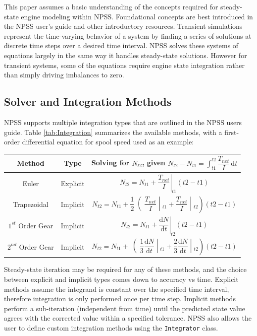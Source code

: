 \documentclass[heading.tex]{subfiles}
\begin{document}
This paper assumes a basic understanding of the concepts required for steady-state engine modeling within NPSS.
Foundational concepts are best introduced in the NPSS user's guide \cite{NPSS} and other introductory resources.
\cite{JonesIntro} 
Transient simulations represent the time-varying behavior of a system by finding a series of
solutions at discrete time steps over a desired time interval. NPSS solves these systems of
equations largely in the same way it handles steady-state solutions. However for transient
systems, some of the equations require engine state integration rather than simply driving imbalances to zero.


\subsection{Solver and Integration Methods}
NPSS supports multiple integration types that are outlined in the NPSS users guide.
\cite[chap.~7.1]{NPSS} Table \ref{tab:Integration} summarizes the available methods, with a 
first-order differential equation for spool speed used as an example: 

\begin{minipage}{\linewidth}
\centering
\bigskip
{} \label{tab:Integration}
\begin{tabular}{|c|c|c|}
\hline 
Method & Type & Solving for  $N_{t2}$, given  $N_{t2}- N_{t1}= \int_{t1}^{t2} \! \dfrac{T_{net}}{I} \, \mathrm{d}t $\\ 
\hline 
Euler & Explicit & $ \left.N_{t2}= N_{t1} + \dfrac{T_{net}}{I} \right|_{t1}^{}(t2-t1)$ \\ 
\hline 
Trapezoidal & Implicit & $ \left.N_{t2}= N_{t1} + \dfrac{1}{2}\middle(\dfrac{T_{net}}{I} \middle|_{t1}^{}+\dfrac{T_{net}}{I} \middle|_{t2}^{}\right)(t2-t1)$ \\ 
\hline 
$1^{st}$ Order Gear & Implicit & $ \left.N_{t2}= N_{t1} + \dfrac{ \mathrm{d}N }{ \mathrm{d}t } \right|_{t2}^{}(t2-t1)$ \\ 
\hline 
$2^{nd}$ Order Gear & Implicit & $ \left.N_{t2}= N_{t1} + \middle(\dfrac{1}{3}\dfrac{ \mathrm{d}N }{ \mathrm{d}t }\middle|_{t1}^{}+\dfrac{2}{3}\dfrac{ \mathrm{d}N }{ \mathrm{d}t }\middle|_{t2}^{}\right)(t2-t1)$ \\ 
\hline 
\end{tabular} 
\end{minipage}

Steady-state iteration may be required for any of these methods, and the choice between explicit
and implicit types comes down to accuracy vs time. Explicit methods assume the integrand is
constant over the specified time interval, therefore integration is only performed once per time
step. Implicit methods perform a sub-iteration (independent from time) until the predicted state
value agrees with the corrected value within a specified tolerance. NPSS also allows the user to
define custom integration methods using the \texttt{Integrator} class. \cite[chap.~15.2]{NPSS}  
\end{document}
